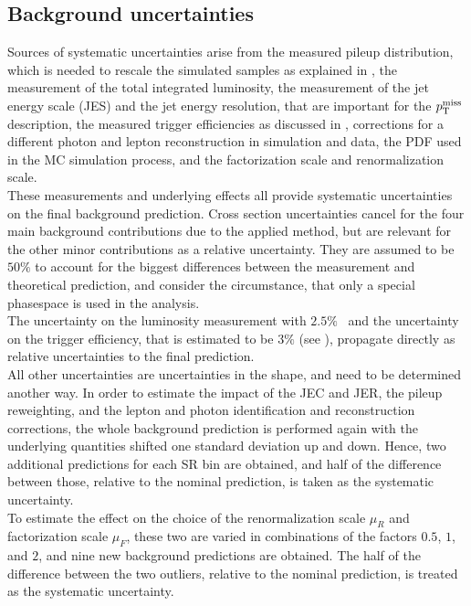 \subsection{Background uncertainties}
Sources of systematic uncertainties arise from the measured pileup distribution,  which is needed to rescale the simulated samples as explained in , the measurement of the total integrated luminosity, the measurement of the jet energy scale (JES) and the jet energy resolution, that are important for the $p_{\mathrm{T}}^\text{miss}$ description, the measured trigger efficiencies as discussed in , corrections for a different photon and lepton reconstruction in simulation and data, the PDF used in the MC simulation process, and the factorization scale and renormalization scale.\\
These measurements and underlying effects all provide systematic uncertainties on the final background prediction. Cross section uncertainties cancel for the four main background contributions due to the applied method, but are relevant for the other minor contributions as a relative uncertainty. They are assumed to be $50\%$ to account for the biggest differences between the measurement and theoretical prediction, and consider the circumstance, that only a special phasespace is used in the analysis.\\
The uncertainty on the luminosity measurement with $2.5\%$~\cite{LumiUncert} and the uncertainty on the trigger efficiency, that is estimated to be $3\%$ (see ), propagate directly as relative uncertainties to the final prediction.\\
All other uncertainties are uncertainties in the shape, and need to be determined another way. In order to estimate the impact of the JEC and JER, the pileup reweighting, and the lepton and photon identification and reconstruction corrections, the whole background prediction is performed again with the underlying quantities shifted one standard deviation up and down. Hence, two additional predictions for each SR bin are obtained, and half of the difference between those, relative to the nominal prediction, is taken as the systematic uncertainty.\\
To estimate the effect on the choice of the renormalization scale $\mu_R$ and factorization scale $\mu_F$, these two are varied in combinations of the factors $0.5$, $1$, and $2$, and nine new background predictions are obtained. The half of the difference between the two outliers, relative to the nominal prediction, is treated as the systematic uncertainty.\\
